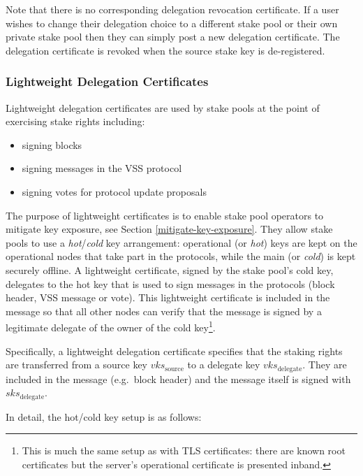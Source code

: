 \documentclass[11pt,a4paper]{article}
\begin{document}
Note that there is no corresponding delegation revocation certificate.
If a user wishes to change their delegation choice to a different stake
pool or their own private stake pool then they can simply post a new
delegation certificate. The delegation certificate is revoked when the
source stake key is de-registered.

\subsubsection{Lightweight Delegation
Certificates}\label{lightweight-delegation-certificates}

Lightweight delegation certificates are used by stake pools at the point
of exercising stake rights including:

\begin{itemize}
\item
  signing blocks
\item
  signing messages in the VSS protocol
\item
  signing votes for protocol update proposals
\end{itemize}

The purpose of lightweight certificates is to enable stake pool
operators to mitigate key exposure, see Section
\ref{mitigate-key-exposure}. They allow stake pools to use a
\emph{hot}/\emph{cold} key arrangement: operational (or \emph{hot}) keys
are kept on the operational nodes that take part in the protocols, while
the main (or \emph{cold}) is kept securely offline. A lightweight
certificate, signed by the stake pool's cold key, delegates to the hot
key that is used to sign messages in the protocols (block header, VSS
message or vote). This lightweight certificate is included in the
message so that all other nodes can verify that the message is signed by
a legitimate delegate of the owner of the cold key\footnote{This is much
  the same setup as with TLS certificates: there are known root
  certificates but the server's operational certificate is presented
  inband.}.

Specifically, a lightweight delegation certificate specifies that the
staking rights are transferred from a source key \(vks_\text{source}\)
to a delegate key \(vks_\text{delegate}\). They are included in the
message (e.g.~block header) and the message itself is signed with
\(sks_\text{delegate}\).

In detail, the hot/cold key setup is as follows:
\end{document}
